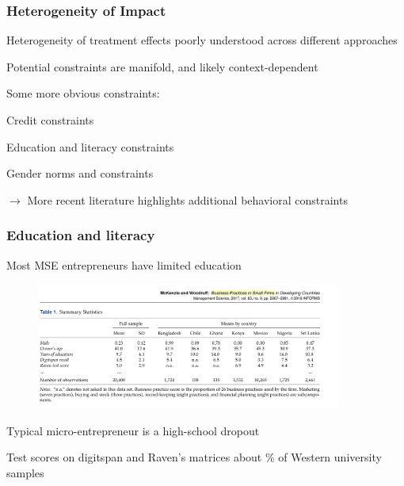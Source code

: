 \documentclass[hideothersubsections, usenames,dvipsnames,11pt]{beamer}
\newenvironment{itemize_2pt}{\itemize\addtolength{\itemsep}{2pt}}{\enditemize}
\begin{document}
\begin{frame}
\frametitle{Heterogeneity of Impact}

Heterogeneity of treatment effects poorly understood across different approaches
\begin{itemize_2pt}
	\item Potential constraints are manifold, and likely context-dependent
	
\vspace{0.5em}	
	
	\item Some more obvious constraints:
	\begin{itemize_2pt}
		\item \textcolor{bdf}{Credit constraints} \citep[e.g.,][]{Berge2015, Gine2021}%
		\item \textcolor{bdf}{Education} and \textcolor{bdf}{literacy constraints}
		\item \textcolor{bdf}{Gender norms and constraints}
	\end{itemize_2pt} 
	
	\vspace{1.0em}

	$\rightarrow$ More recent literature highlights additional \textcolor{bdf}{behavioral constraints}	
	
\end{itemize_2pt}
	

\end{frame}

\begin{frame}
\frametitle{Education and literacy}

Most MSE entrepreneurs have limited education

\vspace{-1.9em}

\begin{figure}[htbp]
	\centering
	\includegraphics[width=27em]{pics/McK2017_educ.png}
	\label{McKenzie(2017): Education and cognitive functioning}
\end{figure}

\vspace{-2.5em}

\begin{itemize_2pt}
	\item Typical micro-entrepreneur is a high-school dropout
	\item Test scores on digitspan and Raven's matrices about \% of Western university samples \textcolor{red}{\citep[comp.][]{}}
\end{itemize_2pt}
\end{frame}
\end{document}
